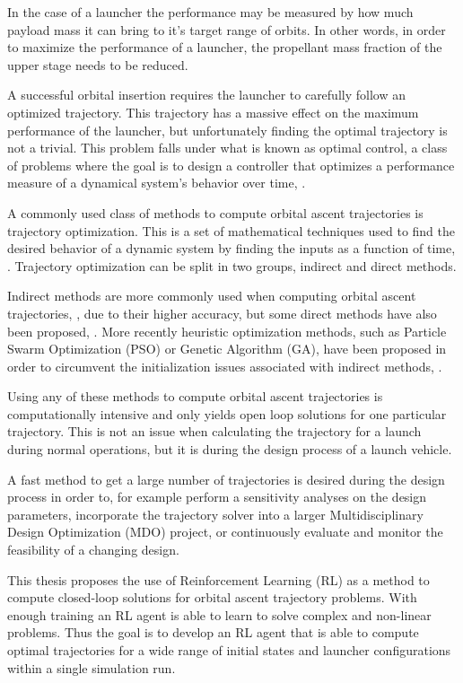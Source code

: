 \documentclass[12pt, english, NoHyper]{AE4010-template}
\begin{document}
In the case of a launcher the performance may be measured by how much payload mass it can bring to it's target range of orbits. In other words, in order to maximize the performance of a launcher, the propellant mass fraction of the upper stage needs to be reduced.

A successful orbital insertion requires the launcher to carefully follow an optimized trajectory. This trajectory has a massive effect on the maximum performance of the launcher, but unfortunately finding the optimal trajectory is not a trivial. This problem falls under what is known as optimal control, a class of problems where the goal is to design a controller that optimizes a performance measure of a dynamical system's behavior over time, \cite{sutton2018reinforcement, betts2010practical}. 

A commonly used class of methods to compute orbital ascent trajectories is trajectory optimization. This is a set of mathematical techniques used to find the desired behavior of a dynamic system by finding the inputs as a function of time, \cite{betts2010practical, kelly2017introduction}. Trajectory optimization can be split in two groups, indirect and direct methods.

Indirect methods are more commonly used when computing orbital ascent trajectories, \cite{von1992direct}, due to their higher accuracy, but some direct methods have also been proposed, \cite{roh2002trajectory, jamilnia2012simultaneous, coverstone1994optimal}. More recently heuristic optimization methods, such as Particle Swarm Optimization (PSO) or Genetic Algorithm (GA), have been proposed in order to circumvent the initialization issues associated with indirect methods, \cite{pontani2014simple, zheng2020ascent}.

Using any of these methods to compute orbital ascent trajectories is computationally intensive and only yields open loop solutions for one particular trajectory. This is not an issue when calculating the trajectory for a launch during normal operations, but it is during the design process of a launch vehicle. 

A fast method to get a large number of trajectories is desired during the design process in order to, for example perform a sensitivity analyses on the design parameters, incorporate the trajectory solver into a larger Multidisciplinary Design Optimization (MDO) project, or continuously evaluate and monitor the feasibility of a changing design. 

This thesis proposes the use of Reinforcement Learning (RL) as a method to compute closed-loop solutions for orbital ascent trajectory problems. With enough training an RL agent is able to learn to solve complex and non-linear problems. Thus the goal is to develop an RL agent that is able to compute optimal trajectories for a wide range of initial states and launcher configurations within a single simulation run.
\end{document}
